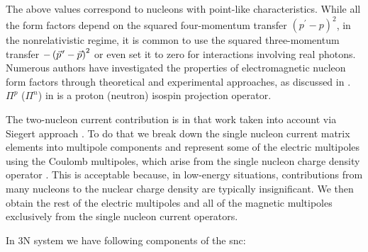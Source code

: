     The above values correspond to nucleons with point-like characteristics. While all the form factors depend on the squared
    four-momentum transfer $\left(p^{\prime}-p\right)^2$, in the nonrelativistic regime, it is common to use the squared
    three-momentum transfer $-\left(\pvec{p}-\vec{p}\right)^2$ or even set it to zero for interactions involving
    real photons. Numerous authors have investigated the properties of electromagnetic nucleon form factors through
    theoretical and experimental approaches, as discussed in \cite{Arrington_2007, JOURDAN1999513c}.
    $\Pi^p$ ($\Pi^n$) in  is a proton (neutron) isospin projection operator.

    The two-nucleon current contribution is in that work taken into account via Siegert approach \cite{Siegert, GolakKamad2000_ExplDescr, Golak2005}.
    To do that we break down the single nucleon current matrix elements into multipole components and 
    represent some of the electric multipoles using the Coulomb multipoles,
    which arise from the single nucleon charge density operator \cite{Golak2005}.
    This is acceptable because, in low-energy situations, contributions from many nucleons to the nuclear charge density are typically insignificant.
    We then obtain the rest of the electric multipoles and all of the magnetic multipoles exclusively from the single nucleon current operators.

    In 3N system we have following components of the \gls{snc}:

